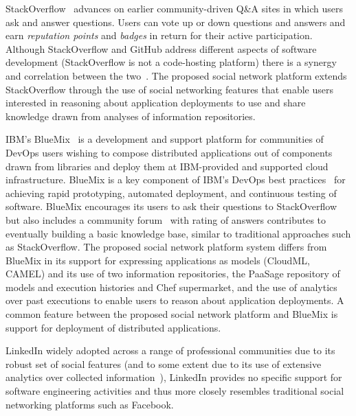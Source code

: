 StackOverflow~\cite{stackoverflow} advances on earlier community-driven Q\&A sites in which users ask and answer questions. Users can vote up or down questions and answers and earn \emph{reputation points} and \emph{badges} in return for their active participation. 
Although StackOverflow and GitHub address different aspects of software development (StackOverflow is not a code-hosting platform) there is a synergy and correlation between the two~\cite{stackgit}. The proposed social network platform extends StackOverflow through the use of social networking features that enable users interested in reasoning about application deployments to use and share knowledge drawn from analyses of information repositories.
 
IBM's BlueMix~\cite{Bluemix-dev} is a development and support platform for communities of DevOps users wishing to compose distributed applications out of components drawn from libraries and deploy them at IBM-provided and supported cloud infrastructure.  BlueMix is a key component of IBM's DevOps best practices~\cite{ibm-devops} for achieving rapid prototyping, automated deployment, and continuous testing of software. BlueMix encourages its users to ask their questions to StackOverflow but also includes a community forum~\cite{Bluemix-dev} with rating of answers contributes to eventually building a basic knowledge base, similar to traditional approaches such as StackOverflow.  The proposed social network platform system differs from BlueMix in its support for expressing applications as models (CloudML, CAMEL) and its use of two information repositories, the PaaSage repository of models and execution histories and Chef supermarket, and the use of analytics over past executions to enable users to reason about application deployments. A common feature between the proposed social network platform and BlueMix is support for deployment of distributed applications. 

LinkedIn widely adopted across a range of professional communities due to its robust set of social features (and to some extent due to its use of extensive analytics over collected information~\cite{sumbaly2013big}), LinkedIn provides no specific support for software engineering activities and thus more closely resembles traditional social networking platforms such as Facebook.


